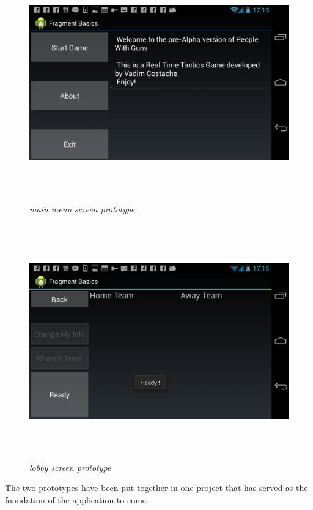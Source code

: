 \documentclass{article}
\begin{document}
\begin{figure}
\includegraphics[height=4in,width=7.12in]{./images/android_screenshots/menu_prototype/MENU_prototype_1.png}  
\caption{\small \sl main menu screen prototype \label{fig:menuPrototype1}}
\end{figure}

\begin{figure}
\includegraphics[height=4in,width=7.12in]{./images/android_screenshots/menu_prototype/MENU_prototype_2.png}  
\caption{\small \sl lobby screen prototype \label{fig:menuPrototype2}}
\end{figure}

The two prototypes have been put together in one project that has served as the
foundation of the application to come.\newline
\end{document}
